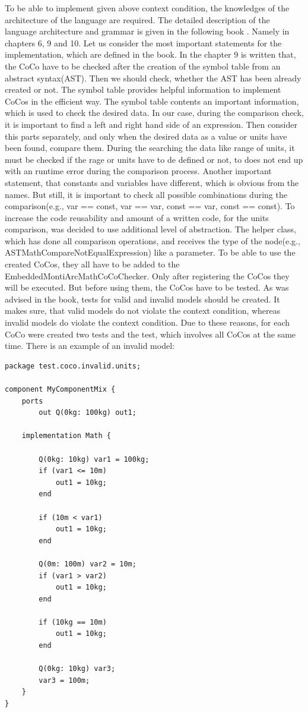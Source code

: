 To be able to implement given above context condition, the knowledges of the architecture of the language are required. The detailed description of the language architecture and grammar is given in the following book \cite{Mon10}. Namely in chapters 6, 9 and 10. Let us consider the most important statements for the implementation, which are defined in the book. In the chapter 9 is written that, the CoCo have to be checked after the creation of the symbol table from an abstract syntax(AST). Then we should check, whether the AST has been already created or not. The symbol table provides helpful information to implement CoCos in the efficient way. The symbol table contents an important information, which is used to check the desired data. In our case, during the comparison check, it is important to find a left and right hand side of an expression. Then consider this parts separately, and only when the desired data as a value or units have been found, compare them. During the searching the data like range of units, it must be checked if the rage or units have to de defined or not, to does not end up with an runtime error during the comparison process. Another important statement, that constants and variables have different, which is obvious from the names. But still, it is important to check all possible combinations during the comparison(e.g., var == const, var == var, const == var, const == const). To increase the code reusability and amount of a written code, for the units comparison, was decided to use additional level of abstraction. The helper class, which has done all comparison operations, and receives the type of the node(e.g., ASTMathCompareNotEqualExpression) like a parameter. \newline
To be able to use the created CoCos, they all have to be added to the EmbeddedMontiArcMathCoCoChecker. Only after registering the CoCos they will be executed. But before using them, the CoCos have to be tested.\newline
As was advised in the book, tests for valid and invalid models should be created. It makes sure, that valid models do not violate the context condition, whereas invalid models do violate the context condition. Due to these reasons, for each CoCo were created two tests and the test, which involves all CoCos at the same time. There is an example of an invalid model:
\bigskip
\begin{lstlisting}
package test.coco.invalid.units;

component MyComponentMix {
    ports
        out Q(0kg: 100kg) out1;

    implementation Math {

        Q(0kg: 10kg) var1 = 100kg;
        if (var1 <= 10m)              
            out1 = 10kg;
        end

        if (10m < var1)
            out1 = 10kg;
        end

        Q(0m: 100m) var2 = 10m;
        if (var1 > var2)
            out1 = 10kg;
        end

        if (10kg == 10m)
            out1 = 10kg;
        end

        Q(0kg: 10kg) var3;
        var3 = 100m;
    }
}
\end{lstlisting}
